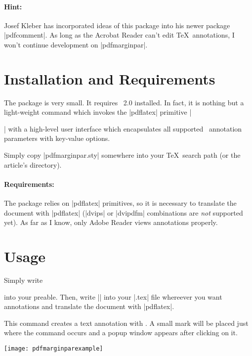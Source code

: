 \documentclass[a4paper]{ltxdoc}
\begin{document}
\paragraph{Hint:} Josef Kleber has incorporated ideas of this package into his newer package |pdfcomment|. As long as the Acrobat Reader can't edit \TeX\ annotations, I won't continue development on |pdfmarginpar|.

\section{Installation and Requirements}
The package is very small. It requires \pgfname\ 2.0 installed. In fact, it is nothing but a light-weight command which invokes the |pdflatex| primitive |\pdfannot| with a high-level user interface which encapsulates all supported \pdf\ annotation parameters with key-value options.

Simply copy |pdfmarginpar.sty| somewhere into your \TeX\ search path (or the article's directory).

\paragraph{Requirements:} The package relies on |pdflatex| primitives, so it is necessary to translate the document with |pdflatex| (|dvips| or |dvipdfm| combinations are \emph{not} supported yet). As far as I know, only Adobe Reader views annotations properly.

\section{Usage}
Simply write
\begin{codeexample}
\usepackage{pdfmarginpar}
\end{codeexample}
\noindent into your preable. Then, write |\pdfmarginpar| into your |.tex| file whereever you want annotations and translate the document with |pdflatex|.

\begin{command}{\pdfmarginpar{}}
	This command creates a text annotation with . A small mark will be placed just where the command occurs and a popup window appears after clicking on it.



\colorbox{graphicbackground}{\texttt{[image: pdfmarginparexample]}}
\end{command}
\end{document}
